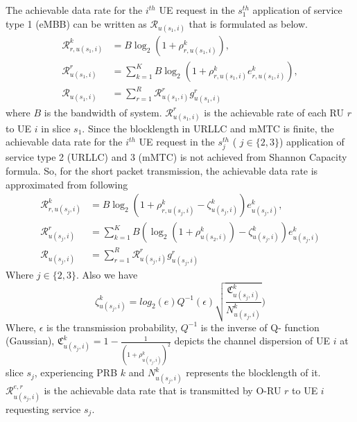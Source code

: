 \documentclass[conference]{IEEEtran}
\begin{document}
The achievable data rate for the $i^{th}$ UE request in the $s_{1}^{th}$ application of service type 1 (eMBB) can be written as $\mathcal{R}_{u(s_1,i)}$ that is formulated as below.
\begin{equation}\label{eq3}
\begin{split}
\mathcal{{R}}_{r,u(s_1,i)}^{k} &=  B \log_2({1+ \rho_{r,u(s_1,i)}^{k}}) ,\\
\mathcal{R}_{u(s_1,i)}^{r} &= \sum_{k=1}^{K} B \log_2({1+ \rho_{r,u(s_1,i)}^{k}} e^k_{r,u(s_1,i)}),\\
\mathcal{R}_{u(s_1,i)} &= \sum_{r=1}^{R}\mathcal{R}_{u(s_1,i)}^{r} g^r_{u(s_1,i)}
\end{split}
\end{equation}
where $B$ is the bandwidth of system. 
$\mathcal{R}_{u(s_1,i)}^{r}$ is the achievable rate of each RU $r$ to UE $i$ in slice $s_1$.
Since the blocklength in URLLC and mMTC is finite, the achievable data rate for the $i^{th}$ UE request in the $s_{j}^{th}$ ( $j \in \{2,3\}$) application of service type 2 (URLLC) and 3 (mMTC) is not achieved from Shannon Capacity formula. So, for the short packet transmission, the achievable data rate is approximated from following
\begin{equation}\label{eq11}
\begin{split}
\mathcal{{R}}_{r,u(s_j,i)}^{k} &= B \log_2({1+ \rho_{r,u(s_j,i)}^{k}} - \zeta_{u(s_j,i)}^{k}){e}_{u(s_j,i)}^{k},\\
\mathcal{R}_{u(s_j,i)}^{r} &= \sum_{k=1}^{K} B (\log_2({1+ \rho_{u(s_2,i)}^{k}})- \zeta_{u(s_j,i)}^{k}){e}_{u(s_j,i)}^{k}\\
\mathcal{R}_{u(s_j,i)} &= \sum_{r=1}^{R}\mathcal{R}_{u(s_j,i)}^{r} g^r_{u(s_j,i)}
\end{split}
\end{equation}
Where $j \in \{2,3\}$. Also we have
\begin{equation}\label{shortPacket}
 \zeta_{u(s_j,i)}^{k} = log_2({e})Q^{-1}(\epsilon) \sqrt{\frac{\mathfrak{C}_{u(s_j,i)}^{k}}{N_{u(s_j,i)}^{k}}})
\end{equation}
Where, $\epsilon $ is the transmission probability, $Q^{-1}$ is the inverse of Q- function (Gaussian),
$\mathfrak{C}_{u(s_j,i)}^{k} = 1 - \frac{1}{(1+\rho_{u(s_j,i)}^{k})^2}$ depicts the channel dispersion of UE  $i$ at slice $s_j$, experiencing PRB $k$ and
$N_{u(s_j,i)}^{k}$ represents the blocklength of it. 
$\mathcal{R}_{u(s_j,i)}^{e,r}$ is the achievable data rate that is transmitted by O-RU $r$ to UE $i$ requesting service $s_j$.
\end{document}
